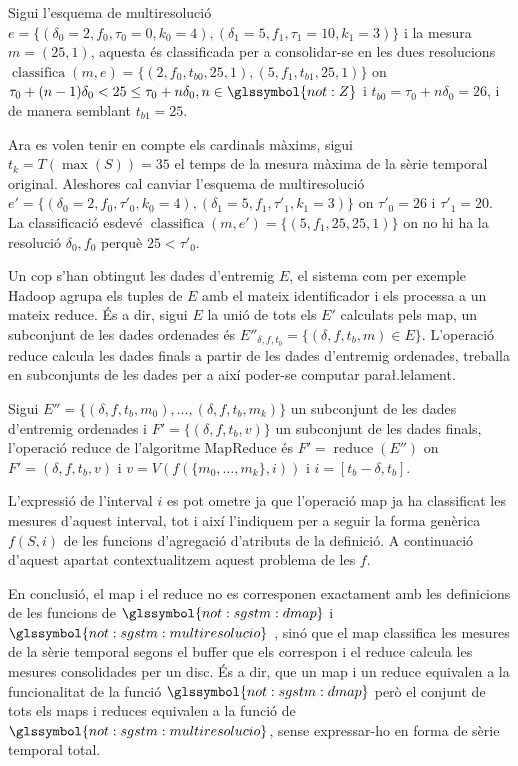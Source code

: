 \begin{example}
  Sigui l'esquema de multiresolució
  $e=\{(\delta_0=2,f_0,\tau_0=0,k_0=4),(\delta_1=5,f_1,\tau_1=10,k_1=3)\}$
  i la mesura $m=(25,1)$, aquesta és classificada per a consolidar-se
  en les dues resolucions $\operatorname{classifica}(m,e)=\{
  (2,f_0,t_{b0},25,1), (5,f_1,t_{b1},25,1) \}$ on
  $\tau_0+(n-1)\delta_0 < 25 \leq \tau_0+n\delta_0,
  n\in\glssymbol{not:Z}$ i $t_{b0}=\tau_0+n\delta_0 = 26$, i de manera
  semblant $t_{b1}= 25$.

  Ara es volen tenir en compte els cardinals màxims, sigui
  $t_k=T(\max(S))=35$ el temps de la mesura màxima de la sèrie
  temporal original. Aleshores cal canviar l'esquema de multiresolució
  $e'=\{(\delta_0=2,f_0,\tau'_0,k_0=4),(\delta_1=5,f_1,\tau'_1,k_1=3)\}$
  on $\tau'_0=26$ i $\tau'_1=20$. La classificació esdevé
  $\operatorname{classifica}(m,e')=\{ (5,f_1,25,25,1) \}$ on no hi ha
  la resolució $\delta_0,f_0$ perquè $25< \tau'_0$.
\end{example}





Un cop s'han obtingut les dades d'entremig $E$, el sistema com per
exemple Hadoop agrupa els tuples de $E$ amb el mateix identificador i
els processa a un mateix reduce. És a dir, sigui $E$ la unió de tots
els $E'$ calculats pels map, un subconjunt de les dades ordenades és
$E''_{\delta,f,t_b} = \{ (\delta,f,t_b,m) \in E \}$.  L'operació
reduce calcula les dades finals a partir de les dades d'entremig
ordenades, treballa en subconjunts de les dades per a així poder-se
computar para\l.lelament.
\begin{definition}
  Sigui $E''= \{ (\delta,f,t_b,m_0) ,\dotsc, (\delta,f,t_b,m_k) \}$ un
  subconjunt de les dades d'entremig ordenades i $F'=\{
  (\delta,f,t_b,v) \}$ un subconjunt de les dades finals, l'operació
  reduce de l'algoritme MapReduce és $F'=\operatorname{reduce}(E'')$
  on $F'= (\delta,f,t_b,v)$ i $v= V( f(\{m_0,\dotsc,m_k\},i))$ i
  $i=[t_b-\delta,t_b]$.
\end{definition}

L'expressió de l'interval $i$ es pot ometre ja que l'operació map ja
ha classificat les mesures d'aquest interval, tot i així l'indiquem
per a seguir la forma genèrica $f(S,i)$ de les funcions d'agregació
d'atributs de la definició. A continuació d'aquest apartat
contextualitzem aquest problema de les $f$.


En conclusió, el map i el reduce no es corresponen exactament
amb les definicions de les funcions de $\glssymbol{not:sgstm:dmap}$ i
$\glssymbol{not:sgstm:multiresolucio}$ , sinó
que el map classifica les mesures de la sèrie temporal segons el
buffer que els correspon i el reduce calcula les mesures consolidades
per un disc. És a dir, que un map i un reduce equivalen a la
funcionalitat de la funció $\glssymbol{not:sgstm:dmap}$ però el
conjunt de tots els maps i reduces equivalen a la funció de
$\glssymbol{not:sgstm:multiresolucio}$, sense expressar-ho en forma de
sèrie temporal total.



